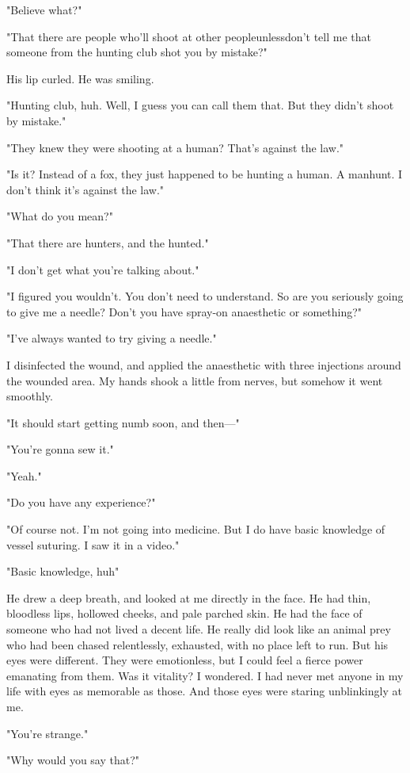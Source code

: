 "Believe what?"

"That there are people who'll shoot at other people\el unless\el don't
tell me that someone from the hunting club shot you by mistake?"

His lip curled. He was smiling.

"Hunting club, huh. Well, I guess you can call them that. But they
didn't shoot by mistake."

"They knew they were shooting at a human? That's against the law."

"Is it? Instead of a fox, they just happened to be hunting a human. A
manhunt. I don't think it's against the law."

"What do you mean?"

"That there are hunters, and the hunted."

"I don't get what you're talking about."

"I figured you wouldn't. You don't need to understand. So are you
seriously going to give me a needle? Don't you have spray-on anaesthetic
or something?"

"I've always wanted to try giving a needle."

I disinfected the wound, and applied the anaesthetic with three
injections around the wounded area. My hands shook a little from nerves,
but somehow it went smoothly.

"It should start getting numb soon, and then---"

"You're gonna sew it."

"Yeah."

"Do you have any experience?"

"Of course not. I'm not going into medicine. But I do have basic
knowledge of vessel suturing. I saw it in a video."

"Basic knowledge, huh\el "

He drew a deep breath, and looked at me directly in the face. He had
thin, bloodless lips, hollowed cheeks, and pale parched skin. He had the
face of someone who had not lived a decent life. He really did look like
an animal prey who had been chased relentlessly, exhausted, with no
place left to run. But his eyes were different. They were emotionless,
but I could feel a fierce power emanating from them. Was it vitality? I
wondered. I had never met anyone in my life with eyes as memorable as
those. And those eyes were staring unblinkingly at me.

"You're strange."

"Why would you say that?"


